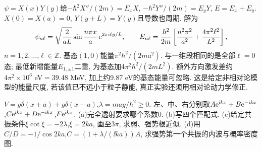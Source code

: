 \begin{solution}
$\psi=X(x)Y(y)$给$-\hbar^2X''/(2m)=E_xX$, $-\hbar^2Y''/(2m)=E_yY$, $E=E_x+E_y$. $X(0)=X(a)=0$, $Y(y+L)=Y(y)$且导数也周期. 解为
\[
\psi_{n\ell}=\sqrt{\frac2{aL}}\sin\frac{n\pi x}a\,\mathrm e^{2\pi\mathrm i\ell y/L},\qquad
E_{n\ell}=\frac{\hbar^2}{2m}\left[\frac{n^2\pi^2}{a^2}+\frac{4\pi^2\ell^2}{L^2}\right],
\]
$n=1,2,\ldots$,$\ell\in\mathbb Z$. 基态$(1,0)$能量$\pi^2\hbar^2/(2ma^2)$. 与一维段相同的是全部$\ell=0$态; 最低新增能量$E_{1,\pm1}$二重, 为基态加$4\pi^2\hbar^2/(2mL^2)$. 额外方向激发差约$4\pi^2\times10^6$ eV$=39.48$ MeV, 加上约9.87 eV的基态能量可忽略. 这是给定非相对论模型的能量尺度, 若该值已不远小于粒子静能, 真正实验还须用相对论动力学修正.
\end{solution}
\begin{exercise}
$V=g\delta(x+a)+g\delta(x-a)$,$\lambda=mag/\hbar^2\geq0$. 左、中、右分别取$A\mathrm e^{\mathrm i kx}+B\mathrm e^{-\mathrm i kx}$,$C\mathrm e^{\mathrm i kx}+D\mathrm e^{-\mathrm i kx}$,$F\mathrm e^{\mathrm i kx}$. (a)完全透射要求哪个系数0. (b)写四个匹配式. (c)给定共振条件$\xi\cot\xi=-2\lambda$,$\xi=2ka$, 画至$3\pi$, 求弱、强势根近似. (d)用$C/D=-1/\cos2ka$,$C=(1+\lambda/(\ii ka))A$, 求强势第一个共振的内波与概率密度图.
\end{exercise}
